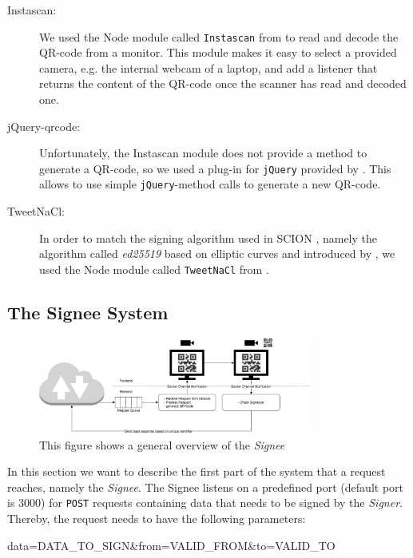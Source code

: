 \begin{description}
\item[Instascan:] We used the Node module called \texttt{Instascan} from \citet{instascan} to read and decode the QR-code from a monitor. This module makes it easy to select a provided camera, e.g. the internal webcam of a laptop, and add a listener that returns the content of the QR-code once the scanner has read and decoded one.
\item[jQuery-qrcode:] Unfortunately, the Instascan module does not provide a method to generate a QR-code, so we used a plug-in for \texttt{jQuery} provided by \citet{jqueryqrcode}. This allows to use simple \texttt{jQuery}-method calls to generate a new QR-code.
\item[TweetNaCl:] In order to match the signing algorithm used in SCION \cite{scion_book}, namely the algorithm called \emph{ed25519} based on elliptic curves and introduced by \citet{bernstein2012high}, we used the Node module called \texttt{TweetNaCl} from \citet{tweetnacl}.
\end{description}


\subsection{The Signee System}\label{subsec:signee}

\begin{figure}
\centering
\includegraphics[width=0.8\textwidth]{images/Signee.png}
\caption{This figure shows a general overview of the \emph{Signee}}
\label{fig:signee}
\end{figure}

In this section we want to describe the first part of the system that a request reaches, namely the \emph{Signee}. The Signee listens on a predefined port (default port is $3000$) for \texttt{POST} requests containing data that needs to be signed by the \emph{Signer}. Thereby, the request needs to have the following parameters:

\begin{code}[caption={Expected message format when sending a new request to the Signee}]
data=DATA_TO_SIGN&from=VALID_FROM&to=VALID_TO
\end{code}

